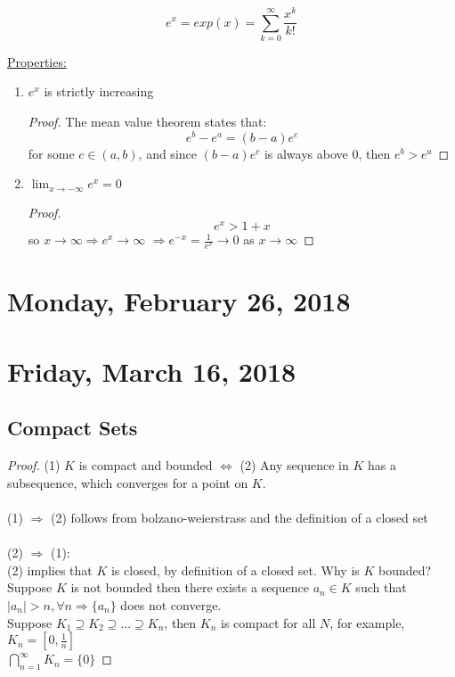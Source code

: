 \documentclass[12pt]{article}
\theoremstyle{plain}
\theoremstyle{definition}
\begin{document}
$$e^x = exp(x) = \sum^\infty_{k=0} \frac{x^k}{k!}$$

\underline{Properties:}
\begin{enumerate}
	\item{
	$e^x$ is strictly increasing
	\begin{proof}
		The mean value theorem states that:
		$$e^b - e^a = (b-a) e^c$$
		for some $c\in (a,b)$, and since $ (b-a) e^c$ is always above 0, then $e^b > e^a$
	\end{proof}

	}
	\item{$\lim_{x\to-\infty} e^x = 0$
	\begin{proof}
		$$e^x > 1+x$$
		so $x\to\infty \Longrightarrow e^x\to\infty$
		$\Longrightarrow e^{-x} = \frac{1}{e^x} \to 0$ as $x\to\infty$
	\end{proof}

	}
\end{enumerate}

\newpage

\section{Monday, February 26, 2018}

\newpage
\section{Friday, March 16, 2018}

\subsection{Compact Sets}
\begin{proof}
	(1) $K$ is compact and bounded $\Longleftrightarrow$ (2) Any sequence in $K$ has a subsequence, which converges for a point on $K$.\\
	\\
	(1) $\Longrightarrow$ (2) follows from bolzano-weierstrass and the definition of a closed set\\
	\\
	(2) $\Longrightarrow$ (1):\\
	(2) implies that $K$ is closed, by definition of a closed set. Why is $K$ bounded? Suppose $K$ is not bounded then there exists a sequence $a_n \in K$ such that $|a_n| > n, \forall n \Longrightarrow \{ a_n \}$ does not converge.\\
	Suppose $K_1 \supseteq K_2 \supseteq ... \supseteq K_n$, then $K_n$ is compact for all $N$, for example, $K_n = [0, \frac{1}{n}]$
	\\
	$\bigcap^\infty_{n=1} K_n = \{ 0 \}$
\end{proof}
\end{document}
